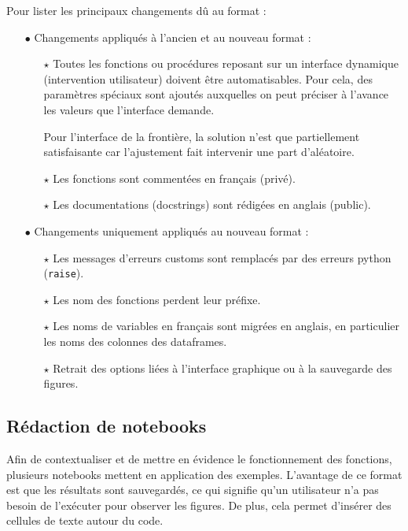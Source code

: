 \documentclass[12pt]{article}
\begin{document}
    Pour lister les principaux changements dû au format :
    \begin{enumerate}
        \item[$\bullet$] Changements appliqués à l'ancien et au nouveau format :

        \begin{enumerate}
            \item[$\star$] Toutes les fonctions ou procédures reposant sur un interface dynamique (intervention utilisateur) doivent être automatisables. Pour cela, des paramètres spéciaux sont ajoutés auxquelles on peut préciser à l'avance les valeurs que l'interface demande.

            Pour l'interface de la frontière, la solution n'est que partiellement satisfaisante car l'ajustement fait intervenir une part d'aléatoire.

            \item[$\star$] Les fonctions sont commentées en français (privé).

            \item[$\star$] Les documentations (docstrings) sont rédigées en anglais (public).
        \end{enumerate}
        
        \item[$\bullet$] Changements uniquement appliqués au nouveau format :

        \begin{enumerate}
            \item[$\star$] Les messages d'erreurs customs sont remplacés par des erreurs python (\texttt{raise}).

            \item[$\star$] Les nom des fonctions perdent leur préfixe.

            \item[$\star$] Les noms de variables en français sont migrées en anglais, en particulier les noms des colonnes des dataframes.

            \item[$\star$] Retrait des options liées à l'interface graphique ou à la sauvegarde des figures.
        \end{enumerate}
    \end{enumerate}

\newpage
\subsection{Rédaction de notebooks}
    Afin de contextualiser et de mettre en évidence le fonctionnement des fonctions, plusieurs notebooks mettent en application des exemples. L'avantage de ce format est que les résultats sont sauvegardés, ce qui signifie qu'un utilisateur n'a pas besoin de l'exécuter pour observer les figures. De plus, cela permet d'insérer des cellules de texte autour du code.
\end{document}
